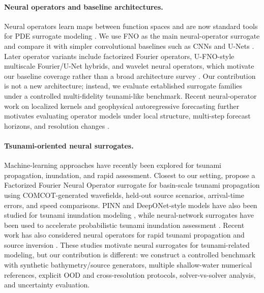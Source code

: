 \paragraph{Neural operators and baseline architectures.}
Neural operators learn maps between function spaces and are now standard tools for PDE surrogate modeling \citep{li2021fno,kovachki2023neuraloperator}. We use FNO as the main neural-operator surrogate and compare it with simpler convolutional baselines such as CNNs and U-Nets \citep{lecun1998gradient,ronneberger2015unet}. Later operator variants include factorized Fourier operators, U-FNO-style multiscale Fourier/U-Net hybrids, and wavelet neural operators, which motivate our baseline coverage rather than a broad architecture survey \citep{tran2023ffno,wen2022ufno,tripura2023wno}. Our contribution is not a new architecture; instead, we evaluate established surrogate families under a controlled multi-fidelity tsunami-like benchmark. Recent neural-operator work on localized kernels and geophysical autoregressive forecasting further motivates evaluating operator models under local structure, multi-step forecast horizons, and resolution changes \citep{liu2024localized,pathak2022fourcastnet,hu2025spherical}.

\paragraph{Tsunami-oriented neural surrogates.}
Machine-learning approaches have recently been explored for tsunami propagation, inundation, and rapid assessment. Closest to our setting, \citet{kim2026ffno_tsunami} propose a Factorized Fourier Neural Operator surrogate for basin-scale tsunami propagation using COMCOT-generated wavefields, held-out source scenarios, arrival-time errors, and speed comparisons. PINN and DeepONet-style models have also been studied for tsunami inundation modeling \citep{brecht2025pinn_tsunami}, while neural-network surrogates have been used to accelerate probabilistic tsunami inundation assessment \citep{fukutani2025prob_tsunami}. Recent work has also considered neural operators for rapid tsunami propagation and source inversion \citep{someya2026tsunamiNO}. These studies motivate neural surrogates for tsunami-related modeling, but our contribution is different: we construct a controlled benchmark with synthetic bathymetry/source generators, multiple shallow-water numerical references, explicit OOD and cross-resolution protocols, solver-vs-solver analysis, and uncertainty evaluation.

